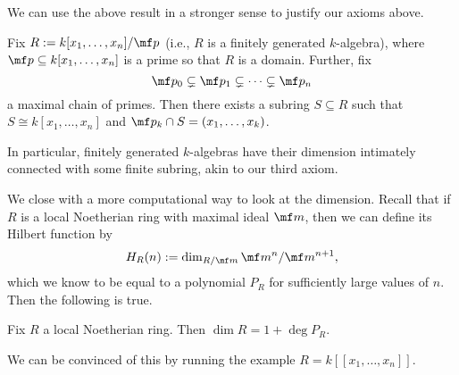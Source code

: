 We can use the above result in a stronger sense to justify our axioms above.
\begin{theorem}
	Fix $R:=k[x_1,\ldots,x_n]/\mf p$ (i.e., $R$ is a finitely generated $k$-algebra), where $\mf p\subseteq k[x_1,\ldots,x_n]$ is a prime so that $R$ is a domain. Further, fix
	\[\mf p_0\subsetneq\mf p_1\subsetneq\cdots\subsetneq\mf p_n\]
	a maximal chain of primes. Then there exists a subring $S\subseteq R$ such that $S\cong k[x_1,\ldots,x_n]$ and $\mf p_k\cap S=(x_1,\ldots,x_k)$.  
\end{theorem}
In particular, finitely generated $k$-algebras have their dimension intimately connected with some finite subring, akin to our third axiom.

We close with a more computational way to look at the dimension. Recall that if $R$ is a local Noetherian ring with maximal ideal $\mf m$, then we can define its Hilbert function by
\[H_R(n):=\dim_{R/\mf m}\mf m^n/\mf m^{n+1},\]
which we know to be equal to a polynomial $P_R$ for sufficiently large values of $n$. Then the following is true.
\begin{theorem}
	Fix $R$ a local Noetherian ring. Then $\dim R=1+\deg P_R$.
\end{theorem}
We can be convinced of this by running the example $R=k[[x_1,\ldots,x_n]]$.